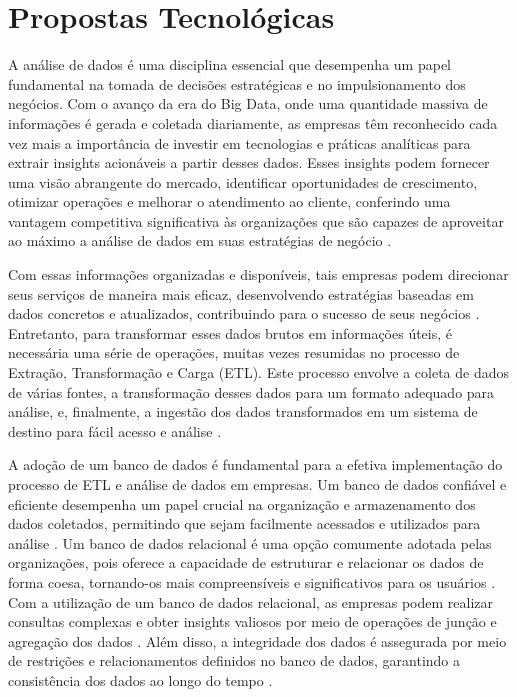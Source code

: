 \chapter{Propostas Tecnológicas}

A análise de dados é uma disciplina essencial que desempenha um papel fundamental na tomada de decisões estratégicas e no impulsionamento dos negócios. Com o avanço da era do Big Data, onde uma quantidade massiva de informações é gerada e coletada diariamente, as empresas têm reconhecido cada vez mais a importância de investir em tecnologias e práticas analíticas para extrair insights acionáveis a partir desses dados. Esses insights podem fornecer uma visão abrangente do mercado, identificar oportunidades de crescimento, otimizar operações e melhorar o atendimento ao cliente, conferindo uma vantagem competitiva significativa às organizações que são capazes de aproveitar ao máximo a análise de dados em suas estratégias de negócio \cite{mayer2013big, chen2012business, reddy2013data, watson2010current, white2012hadoop}.

Com essas informações organizadas e disponíveis, tais empresas podem direcionar seus serviços de maneira mais eficaz, desenvolvendo estratégias baseadas em dados concretos e atualizados, contribuindo para o sucesso de seus negócios \cite{chen2012business}.
Entretanto, para transformar esses dados brutos em informações úteis, é necessária uma série de operações, muitas vezes resumidas no processo de Extração, Transformação e Carga (ETL). Este processo envolve a coleta de dados de várias fontes, a transformação desses dados para um formato adequado para análise, e, finalmente, a ingestão dos dados transformados em um sistema de destino para fácil acesso e análise \cite{vassiliadis2002conceptual}.

A adoção de um banco de dados é fundamental para a efetiva implementação do processo de ETL e análise de dados em empresas. Um banco de dados confiável e eficiente desempenha um papel crucial na organização e armazenamento dos dados coletados, permitindo que sejam facilmente acessados e utilizados para análise \cite{elmasri2019fundamentals}. Um banco de dados relacional é uma opção comumente adotada pelas organizações, pois oferece a capacidade de estruturar e relacionar os dados de forma coesa, tornando-os mais compreensíveis e significativos para os usuários \cite{date2003introduction}. Com a utilização de um banco de dados relacional, as empresas podem realizar consultas complexas e obter insights valiosos por meio de operações de junção e agregação dos dados \cite{connolly2014database}. Além disso, a integridade dos dados é assegurada por meio de restrições e relacionamentos definidos no banco de dados, garantindo a consistência dos dados ao longo do tempo \cite{silberschatz2019database}.


